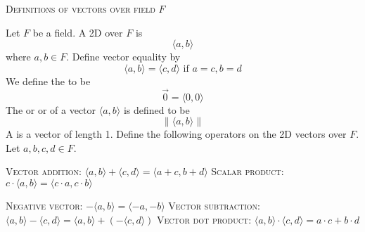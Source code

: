 \textsc{Definitions of vectors over field $F$}

Let $F$ be a field.
A 2D  over $F$ is
\[
\langle a, b \rangle
\]
where $a, b \in F$.
Define vector equality by
\[
\langle a, b \rangle
=
\langle c, d \rangle
\text{ if }
a=c, b=d
\]
We define the  to be
\[
\vec{0} = \langle 0, 0 \rangle
\]
The  or  or 
of a vector $\langle a, b \rangle$ is defined to be
\[
\| \langle a, b \rangle \|
\]
A  is a vector of length 1.
Define the following operators on the 2D vectors over $F$.
Let $a, b, c, d \in F$.
\begin{myenumt}
\li
\textsc{Vector addition}:
$\langle a, b \rangle + \langle c, d \rangle = \langle a + c, b + d \rangle$
\li
\textsc{Scalar product}:
$c \cdot \langle a, b \rangle = \langle c \cdot a, c \cdot b \rangle$

\li
\textsc{Negative vector}:
$-\langle a, b \rangle = \langle -a, -b \rangle$
\li
\textsc{Vector subtraction}:
$\langle a, b \rangle - \langle c, d \rangle = \langle a, b \rangle + (-\langle c, d \rangle)$
\li
\textsc{Vector dot product}:
$\langle a, b \rangle \cdot \langle c, d \rangle = a\cdot c + b \cdot d$
\end{myenumt}

